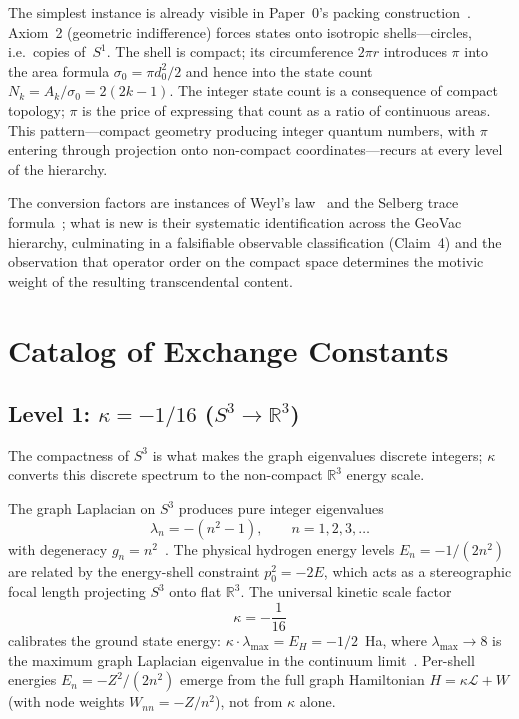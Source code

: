 \documentclass[aps,pra,twocolumn,superscriptaddress,longbibliography]{revtex4-2}
\begin{document}
The simplest instance is already visible in Paper~0's packing
construction~\cite{loutey_paper0}.  Axiom~2 (geometric indifference)
forces states onto isotropic shells---circles, i.e.\ copies of~$S^1$.
The shell is compact; its circumference $2\pi r$ introduces $\pi$
into the area formula $\sigma_0 = \pi d_0^2/2$ and hence into the
state count $N_k = A_k / \sigma_0 = 2(2k-1)$.  The integer state count
is a consequence of compact topology; $\pi$ is the price of expressing
that count as a ratio of continuous areas.  This pattern---compact
geometry producing integer quantum numbers, with $\pi$ entering
through projection onto non-compact coordinates---recurs at every level
of the hierarchy.

The conversion factors are instances of Weyl's law~\cite{weyl1911} and
the Selberg trace formula~\cite{selberg1956}; what is new is their
systematic identification across the GeoVac hierarchy, culminating in a
falsifiable observable classification (Claim~4) and the observation that
operator order on the compact space determines the motivic weight of the
resulting transcendental content.



\section{Catalog of Exchange Constants}
\label{sec:catalog}

\subsection{Level 1: $\kappa = -1/16$ ($S^3 \to \mathbb{R}^3$)}
\label{sec:kappa}

The compactness of $S^3$ is what makes the graph eigenvalues discrete
integers; $\kappa$ converts this discrete spectrum to the non-compact
$\mathbb{R}^3$ energy scale.

The graph Laplacian on $S^3$ produces pure integer eigenvalues
\begin{equation}
  \lambda_n = -(n^2 - 1), \qquad n = 1, 2, 3, \ldots
  \label{eq:s3_eigenvalues}
\end{equation}
with degeneracy $g_n = n^2$~\cite{loutey_paper7}.  The physical
hydrogen energy levels $E_n = -1/(2n^2)$ are related by the
energy-shell constraint $p_0^2 = -2E$, which acts as a
stereographic focal length projecting $S^3$ onto flat
$\mathbb{R}^3$.  The universal kinetic scale factor
\begin{equation}
  \kappa = -\frac{1}{16}
  \label{eq:kappa}
\end{equation}
calibrates the ground state energy:
$\kappa \cdot \lambda_{\max} = E_H = -1/2$~Ha, where
$\lambda_{\max} \to 8$ is the maximum graph Laplacian eigenvalue
in the continuum limit~\cite{loutey_paper0}.  Per-shell energies
$E_n = -Z^2/(2n^2)$ emerge from the full graph Hamiltonian
$H = \kappa \mathcal{L} + W$ (with node weights $W_{nn} = -Z/n^2$),
not from $\kappa$ alone.
\end{document}
